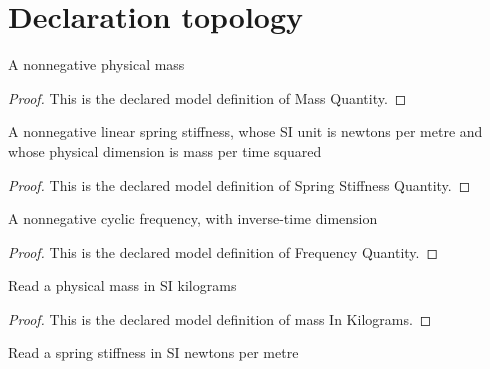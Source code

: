 \section{Declaration topology}
\begin{definition}
  \label{def:physics:phyx-mini-0256:phyxminiproblems-problemphyxmini0256-massquantity}
  A nonnegative physical mass
\end{definition}
\begin{proof}
  This is the declared model definition of Mass Quantity.
\end{proof}
\begin{definition}
  \label{def:physics:phyx-mini-0256:phyxminiproblems-problemphyxmini0256-springstiffnessquantity}
  A nonnegative linear spring stiffness, whose SI unit is newtons per metre and whose physical dimension is mass per time squared
\end{definition}
\begin{proof}
  This is the declared model definition of Spring Stiffness Quantity.
\end{proof}
\begin{definition}
  \label{def:physics:phyx-mini-0256:phyxminiproblems-problemphyxmini0256-frequencyquantity}
  A nonnegative cyclic frequency, with inverse-time dimension
\end{definition}
\begin{proof}
  This is the declared model definition of Frequency Quantity.
\end{proof}
\begin{definition}
  \label{def:physics:phyx-mini-0256:phyxminiproblems-problemphyxmini0256-massinkilograms}
  Read a physical mass in SI kilograms
\end{definition}
\begin{proof}
  This is the declared model definition of mass In Kilograms.
\end{proof}
\begin{definition}
  \label{def:physics:phyx-mini-0256:phyxminiproblems-problemphyxmini0256-stiffnessinnewtonspermeter}
  Read a spring stiffness in SI newtons per metre
\end{definition}
